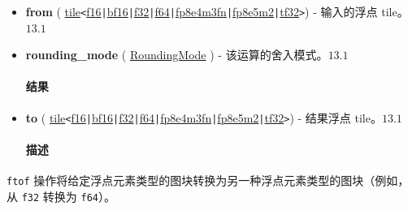 \documentclass{article}
\begin{document}
\begin{itemize}
\item \textbf{from} ( \href{https://docs.nvidia.com/cuda/tile-ir/latest/sections/types.html#type-tile}{tile}\texttt{<}\href{https://docs.nvidia.com/cuda/tile-ir/latest/sections/types.html#subsection-element-types}{f16}\texttt{|}\href{https://docs.nvidia.com/cuda/tile-ir/latest/sections/types.html#subsection-element-types}{bf16}\texttt{|}\href{https://docs.nvidia.com/cuda/tile-ir/latest/sections/types.html#subsection-element-types}{f32}\texttt{|}\href{https://docs.nvidia.com/cuda/tile-ir/latest/sections/types.html#subsection-element-types}{f64}\texttt{|}\href{https://docs.nvidia.com/cuda/tile-ir/latest/sections/types.html#subsection-element-types}{fp8e4m3fn}\texttt{|}\href{https://docs.nvidia.com/cuda/tile-ir/latest/sections/types.html#subsection-element-types}{fp8e5m2}\texttt{|}\href{https://docs.nvidia.com/cuda/tile-ir/latest/sections/types.html#subsection-element-types}{tf32}\texttt{>}) - 输入的浮点 tile。$\boxed{13.1}$
\item \textbf{rounding\_mode} ( \href{https://docs.nvidia.com/cuda/tile-ir/latest/sections/operations.html#op-attribute-cuda-tile-ftof-roundingmode-attr}{RoundingMode} ) - 该运算的舍入模式。$\boxed{13.1}$


\paragraph{结果}

\item \textbf{to} ( \href{https://docs.nvidia.com/cuda/tile-ir/latest/sections/types.html#type-tile}{tile}\texttt{<}\href{https://docs.nvidia.com/cuda/tile-ir/latest/sections/types.html#subsection-element-types}{f16}\texttt{|}\href{https://docs.nvidia.com/cuda/tile-ir/latest/sections/types.html#subsection-element-types}{bf16}\texttt{|}\href{https://docs.nvidia.com/cuda/tile-ir/latest/sections/types.html#subsection-element-types}{f32}\texttt{|}\href{https://docs.nvidia.com/cuda/tile-ir/latest/sections/types.html#subsection-element-types}{f64}\texttt{|}\href{https://docs.nvidia.com/cuda/tile-ir/latest/sections/types.html#subsection-element-types}{fp8e4m3fn}\texttt{|}\href{https://docs.nvidia.com/cuda/tile-ir/latest/sections/types.html#subsection-element-types}{fp8e5m2}\texttt{|}\href{https://docs.nvidia.com/cuda/tile-ir/latest/sections/types.html#subsection-element-types}{tf32}\texttt{>}) - 结果浮点 tile。$\boxed{13.1}$


\paragraph{描述}

\end{itemize}
\texttt{ftof} 操作将给定浮点元素类型的图块转换为另一种浮点元素类型的图块（例如，从 \texttt{f32} 转换为 \texttt{f64}）。
\end{document}

